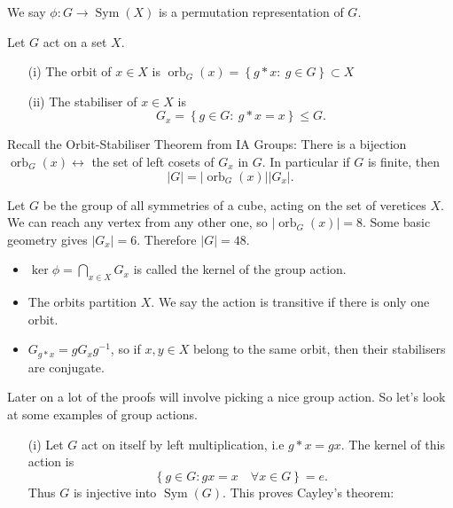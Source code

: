 \documentclass[a4paper]{scrartcl}
\begin{document}
\begin{definition*}
      We say $\phi: G \rightarrow \operatorname{Sym}(X)$ is a permutation representation of $G$.
\end{definition*}
\begin{definition*}
     Let $G$ act on a set $X$. 
     \begin{itemize}
          \item[(i)] The orbit of $x \in X$ is $\operatorname{orb}_G (x)=\left\{g \ast x: \ g \in G\right\} \subset X$
          \item[(ii)] The stabiliser of $x \in X$ is \[
          G_{x}=\left\{g \in G: \ g \ast x=x\right\} \leq G
          .\] 
     \end{itemize}
\end{definition*}
Recall the Orbit-Stabiliser Theorem from IA Groups: There is a bijection $\operatorname{orb}_G (x) \leftrightarrow $ the set of left cosets of $G_{x}$ in $G$. In particular if $G$ is finite, then \[
|G|=|\operatorname{orb}_G (x)| |G_{x}|
.\] 
\begin{example*}
      Let $G$ be the group of all symmetries of a cube, acting on the set of veretices $X$. We can reach any vertex from any other one, so $|\operatorname{orb}_G (x)|=8$. Some basic geometry gives $|G_{x}|=6$. Therefore $|G|=48$.
\end{example*} 
\begin{remark}
      \begin{itemize}
           \item $\operatorname{ker} \phi=\bigcap_{x \in X}G_{x}$ is called the kernel of the group action. 
           \item The orbits partition $X$. We say the action is transitive if there is only one orbit.
           \item $G_{g \ast x}=g G_{x} {g}^{-1}$, so if $x,y \in X$ belong to the same orbit, then their stabilisers are conjugate.
      \end{itemize}
\end{remark}
Later on a lot of the proofs will involve picking a nice group action. So let's look at some examples of group actions. 
\begin{itemize}
     \item[(i)] Let $G$ act on itself by left multiplication, i.e $g \ast x =gx$. The kernel of this action is \[
     \left\{g \in G: gx=x \quad \forall x \in G\right\}=e
     .\] Thus $G $ is injective into $\operatorname{Sym}(G)$. This proves Cayley's theorem:
 \end{itemize}
\end{document}
